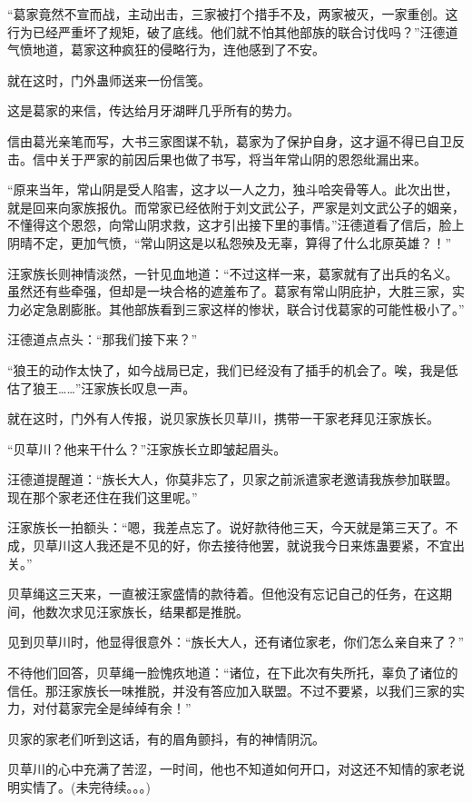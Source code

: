 \begin{this_body}
“葛家竟然不宣而战，主动出击，三家被打个措手不及，两家被灭，一家重创。这行为已经严重坏了规矩，破了底线。他们就不怕其他部族的联合讨伐吗？”汪德道气愤地道，葛家这种疯狂的侵略行为，连他感到了不安。

就在这时，门外蛊师送来一份信笺。

这是葛家的来信，传达给月牙湖畔几乎所有的势力。

信由葛光亲笔而写，大书三家图谋不轨，葛家为了保护自身，这才逼不得已自卫反击。信中关于严家的前因后果也做了书写，将当年常山阴的恩怨纰漏出来。

“原来当年，常山阴是受人陷害，这才以一人之力，独斗哈突骨等人。此次出世，就是回来向家族报仇。而常家已经依附于刘文武公子，严家是刘文武公子的姻亲，不懂得这个恩怨，向常山阴求救，这才引出接下里的事情。”汪德道看了信后，脸上阴晴不定，更加气愤，“常山阴这是以私怨殃及无辜，算得了什么北原英雄？！”

汪家族长则神情淡然，一针见血地道：“不过这样一来，葛家就有了出兵的名义。虽然还有些牵强，但却是一块合格的遮羞布了。葛家有常山阴庇护，大胜三家，实力必定急剧膨胀。其他部族看到三家这样的惨状，联合讨伐葛家的可能性极小了。”

汪德道点点头：“那我们接下来？”

“狼王的动作太快了，如今战局已定，我们已经没有了插手的机会了。唉，我是低估了狼王……”汪家族长叹息一声。

就在这时，门外有人传报，说贝家族长贝草川，携带一干家老拜见汪家族长。

“贝草川？他来干什么？”汪家族长立即皱起眉头。

汪德道提醒道：“族长大人，你莫非忘了，贝家之前派遣家老邀请我族参加联盟。现在那个家老还住在我们这里呢。”

汪家族长一拍额头：“嗯，我差点忘了。说好款待他三天，今天就是第三天了。不成，贝草川这人我还是不见的好，你去接待他罢，就说我今日来炼蛊要紧，不宜出关。”

贝草绳这三天来，一直被汪家盛情的款待着。但他没有忘记自己的任务，在这期间，他数次求见汪家族长，结果都是推脱。

见到贝草川时，他显得很意外：“族长大人，还有诸位家老，你们怎么亲自来了？”

不待他们回答，贝草绳一脸愧疚地道：“诸位，在下此次有失所托，辜负了诸位的信任。那汪家族长一味推脱，并没有答应加入联盟。不过不要紧，以我们三家的实力，对付葛家完全是绰绰有余！”

贝家的家老们听到这话，有的眉角颤抖，有的神情阴沉。

贝草川的心中充满了苦涩，一时间，他也不知道如何开口，对这还不知情的家老说明实情了。(未完待续。。。)

\end{this_body}


